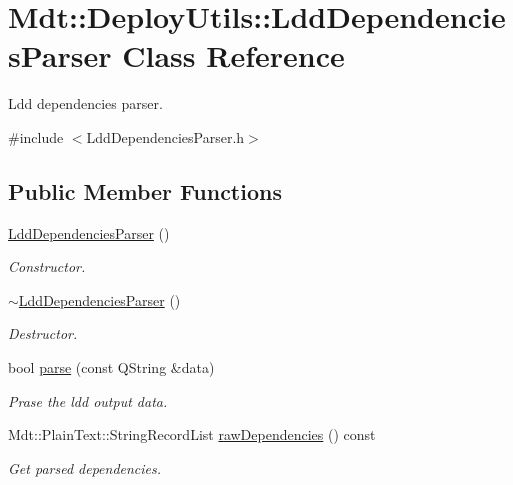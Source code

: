 \hypertarget{class_mdt_1_1_deploy_utils_1_1_ldd_dependencies_parser}{}\section{Mdt\+:\+:Deploy\+Utils\+:\+:Ldd\+Dependencies\+Parser Class Reference}
\label{class_mdt_1_1_deploy_utils_1_1_ldd_dependencies_parser}


Ldd dependencies parser.  




{\ttfamily \#include $<$Ldd\+Dependencies\+Parser.\+h$>$}

\subsection*{Public Member Functions}
\begin{DoxyCompactItemize}
\item 
\hyperlink{class_mdt_1_1_deploy_utils_1_1_ldd_dependencies_parser_aa06c5965c3adaa271321ccecef14b65c}{Ldd\+Dependencies\+Parser} ()
\begin{DoxyCompactList}\small\item\em Constructor. \end{DoxyCompactList}\item 
\hyperlink{class_mdt_1_1_deploy_utils_1_1_ldd_dependencies_parser_aa5ab2d4b01b68b132a973b3b58db4b8a}{$\sim$\+Ldd\+Dependencies\+Parser} ()
\begin{DoxyCompactList}\small\item\em Destructor. \end{DoxyCompactList}\item 
bool \hyperlink{class_mdt_1_1_deploy_utils_1_1_ldd_dependencies_parser_aa2c2457f54068d376232fbc07446b8fd}{parse} (const Q\+String \&data)
\begin{DoxyCompactList}\small\item\em Prase the ldd output data. \end{DoxyCompactList}\item 
Mdt\+::\+Plain\+Text\+::\+String\+Record\+List \hyperlink{class_mdt_1_1_deploy_utils_1_1_ldd_dependencies_parser_a2ccf5f86c355f916a0e9a304537e4087}{raw\+Dependencies} () const 
\begin{DoxyCompactList}\small\item\em Get parsed dependencies. \end{DoxyCompactList}\end{DoxyCompactItemize}


